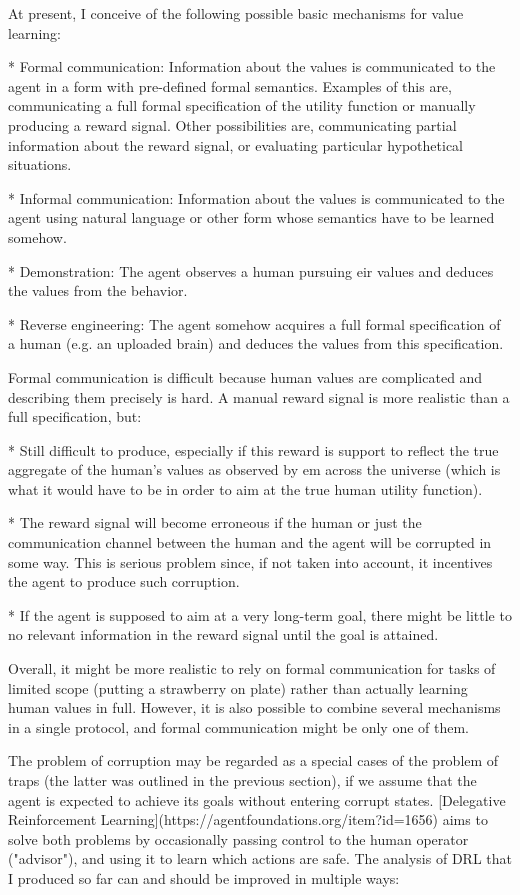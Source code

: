 \documentclass[a4paper]{article}
\begin{document}
At present, I conceive of the following possible basic mechanisms for value learning:

* Formal communication: Information about the values is communicated to the agent in a form with pre-defined formal semantics. Examples of this are, communicating a full formal specification of the utility function or manually producing a reward signal. Other possibilities are, communicating partial information about the reward signal, or evaluating particular hypothetical situations.

* Informal communication: Information about the values is communicated to the agent using natural language or other form whose semantics have to be learned somehow.

* Demonstration: The agent observes a human pursuing eir values and deduces the values from the behavior.

* Reverse engineering: The agent somehow acquires a full formal specification of a human (e.g. an uploaded brain) and deduces the values from this specification.

Formal communication is difficult because human values are complicated and describing them precisely is hard. A manual reward signal is more realistic than a full specification, but:

* Still difficult to produce, especially if this reward is support to reflect the true aggregate of the human's values as observed by em across the universe (which is what it would have to be in order to aim at the true human utility function).

* The reward signal will become erroneous if the human or just the communication channel between the human and the agent will be corrupted in some way. This is serious problem since, if not taken into account, it incentives the agent to produce such corruption.

* If the agent is supposed to aim at a very long-term goal, there might be little to no relevant information in the reward signal until the goal is attained.

Overall, it might be more realistic to rely on formal communication for tasks of limited scope (putting a strawberry on plate) rather than actually learning human values in full. However, it is also possible to combine several mechanisms in a single protocol, and formal communication might be only one of them.

The problem of corruption may be regarded as a special cases of the problem of traps (the latter was outlined in the previous section), if we assume that the agent is expected to achieve its goals without entering corrupt states. [Delegative Reinforcement Learning](https://agentfoundations.org/item?id=1656) aims to solve both problems by occasionally passing control to the human operator ("advisor"), and using it to learn which actions are safe. The analysis of DRL that I produced so far can and should be improved in multiple ways:
\end{document}
